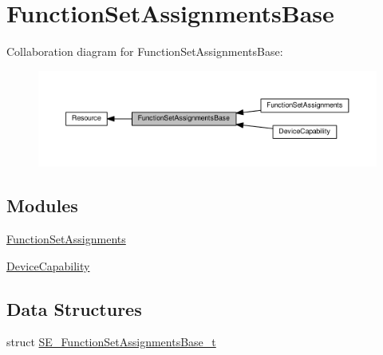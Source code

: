 \hypertarget{group__FunctionSetAssignmentsBase}{}\section{Function\+Set\+Assignments\+Base}
\label{group__FunctionSetAssignmentsBase}
Collaboration diagram for Function\+Set\+Assignments\+Base\+:\nopagebreak
\begin{figure}[H]
\begin{center}
\leavevmode
\includegraphics[width=350pt]{group__FunctionSetAssignmentsBase}
\end{center}
\end{figure}
\subsection*{Modules}
\begin{DoxyCompactItemize}
\item 
\hyperlink{group__FunctionSetAssignments}{Function\+Set\+Assignments}
\item 
\hyperlink{group__DeviceCapability}{Device\+Capability}
\end{DoxyCompactItemize}
\subsection*{Data Structures}
\begin{DoxyCompactItemize}
\item 
struct \hyperlink{structSE__FunctionSetAssignmentsBase__t}{S\+E\+\_\+\+Function\+Set\+Assignments\+Base\+\_\+t}
\end{DoxyCompactItemize}
